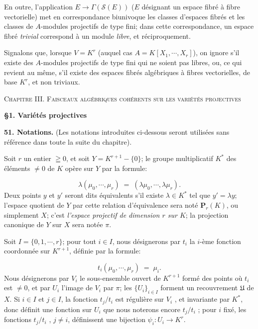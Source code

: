 
En outre, l'application $E \to \Gamma(\mathcal{S}(E))$ ($E$ désignant un espace fibré à fibre vectorielle) met en correspondance biunivoque les classes d'espaces fibrés et les classes de $A$-modules projectifs de type fini; dans cette correspondance, un espace fibré \textit{trivial} correspond à un module \textit{libre}, et réciproquement.

Signalons que, lorsque $V = K^r$ (auquel cas $A = K[X_1 , \cdots , X_r]$), on ignore s'il existe des $A$-modules projectifs de type fini qui ne soient pas libres, ou, ce qui revient au même, s'il existe des espaces fibrés algébriques à fibres vectorielles, de base $K^r$, et non triviaux.


\textsc{Chapitre III. Faisceaux algébriques cohérents sur les variétés projectives}


\textbf{§1. Variétés projectives}

\textbf{51. Notations.} (Les notations introduites ci-dessous seront utilisées sans référence dans toute la suite du chapitre).

Soit $r$ un entier $\geqq 0$, et soit $Y = K^{r+1} - \{0\}$; le groupe multiplicatif $K^*$ des éléments $\neq 0$ de $K$ opère sur $Y$ par la formule:

\begin{equation*}
\lambda(\mu_0 , \cdots , \mu_r) \;=\; (\lambda\mu_0 , \cdots , \lambda\mu_r).
\end{equation*}
Deux points $y$ et $y'$ seront dits équivalents s'il existe $\lambda \in K^*$ tel que $y' = \lambda y$; l'espace quotient de $Y$ par cette relation d'équivalence sera noté $\mathbf{P}_r(K)$, ou simplement $X$; c'est \textit{l'espace projectif de dimension $r$ sur $K$}; la projection canonique de $Y$ sur $X$ sera notée $\pi$.

Soit $I = \{0, 1, \cdots , r\}$; pour tout $i \in I$, nous désignerons par $t_i$ la $i$-ème fonction coordonnée sur $K^{r+1}$, définie par la formule:

\begin{equation*}
t_i(\mu_0 , \cdots , \mu_r) \;=\; \mu_i .
\end{equation*}
Nous désignerons par $V_i$ le sous-ensemble ouvert de $K^{r+1}$ formé des points où $t_i$ est $\neq 0$, et par $U_i$ l'image de $V_i$ par $\pi$; les $\{U_i\}_{i \in I}$ forment un recouvrement $\mathfrak{U}$ de $X$. Si $i \in I$ et $j \in I$, la fonction $t_j/t_i$ est régulière sur $V_i$ , et invariante par $K^*$, donc définit une fonction sur $U_i$ que nous noterons encore $t_j/t_i$ ; pour $i$ fixé, les fonctions $t_j/t_i$ , $j \neq i$, définissent une bijection $\psi_i : U_i \to K^r$.

